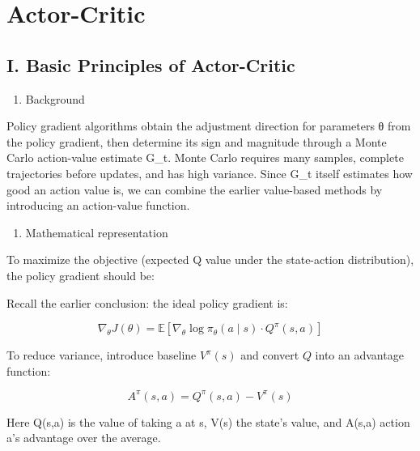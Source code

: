 \setcounter{section}{0}

\hypertarget{actor-critic}{%
\section{Actor-Critic}\label{actor-critic}}

\hypertarget{i.-basic-principles-of-actor-critic}{%
\subsection{I. Basic Principles of Actor-Critic}\label{i.-basic-principles-of-actor-critic}}

\begin{enumerate}
\def\labelenumi{\arabic{enumi}.}
\tightlist
\item
  Background
\end{enumerate}

Policy gradient algorithms obtain the adjustment direction for parameters θ from the policy gradient, then determine its sign and magnitude through a Monte Carlo action-value estimate G\_t. Monte Carlo requires many samples, complete trajectories before updates, and has high variance. Since G\_t itself estimates how good an action value is, we can combine the earlier value-based methods by introducing an action-value function.

\begin{enumerate}
\def\labelenumi{\arabic{enumi}.}
\setcounter{enumi}{1}
\tightlist
\item
  Mathematical representation
\end{enumerate}

To maximize the objective (expected Q value under the state-action distribution), the policy gradient should be:

Recall the earlier conclusion: the ideal policy gradient is:

\[
\nabla_\theta J(\theta)=\mathbb{E}\left[\nabla_\theta\log\pi_\theta(a\mid s)\cdot Q^\pi(s,a)\right]
\]

To reduce variance, introduce baseline \(V^\pi(s)\) and convert \(Q\) into an advantage function:

\[
A^\pi(s,a)=Q^\pi(s,a)-V^\pi(s)
\]

Here Q(s,a) is the value of taking a at s, V(s) the state's value, and A(s,a) action a's advantage over the average.

